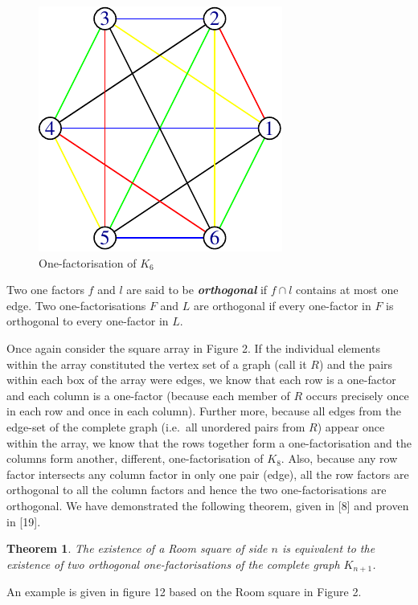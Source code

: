 \documentclass[
  12pt,
  a4paper]{book}
\newtheorem{theorem}{Theorem}
\begin{document}
\begin{figure}
\centering
\includegraphics{figure/one-factorisation-1.pdf}
\caption{One-factorisation of \(K_6\)}
\end{figure}

Two one factors \(f\) and \(l\) are said to be
\textbf{\emph{orthogonal}} if \(f \cap l\) contains at most one edge.
Two one-factorisations \(F\) and \(L\) are orthogonal if every
one-factor in \(F\) is orthogonal to every one-factor in \(L\).

Once again consider the square array in Figure 2. If the individual
elements within the array constituted the vertex set of a graph (call it
\(R\)) and the pairs within each box of the array were edges, we know
that each row is a one-factor and each column is a one-factor (because
each member of \(R\) occurs precisely once in each row and once in each
column). Further more, because all edges from the edge-set of the
complete graph (i.e.~all unordered pairs from \(R\)) appear once within
the array, we know that the rows together form a one-factorisation and
the columns form another, different, one-factorisation of \(K_8\). Also,
because any row factor intersects any column factor in only one pair
(edge), all the row factors are orthogonal to all the column factors and
hence the two one-factorisations are orthogonal. We have demonstrated
the following theorem, given in {[}8{]} and proven in {[}19{]}.

\begin{theorem}
The existence of a Room square of side
$n$
is equivalent to the existence of two orthogonal
one-factorisations of the complete graph
$K_{n+1}$.
\end{theorem}

An example is given in figure 12 based on the Room square in Figure 2.
\end{document}
